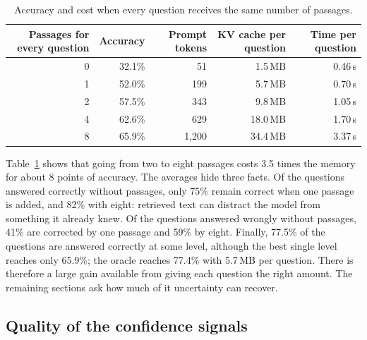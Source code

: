 \documentclass[11pt,a4paper]{article}
\begin{document}
\begin{table}[H]
\centering
\small
\begin{tabular}{@{}rrrrr@{}}
\toprule
Passages for every question & Accuracy & Prompt tokens & KV cache per question & Time per question \\
\midrule
0 & 32.1\% & 51 & 1.5\,MB & 0.46\,s \\
1 & 52.0\% & 199 & 5.7\,MB & 0.70\,s \\
2 & 57.5\% & 343 & 9.8\,MB & 1.05\,s \\
4 & 62.6\% & 629 & 18.0\,MB & 1.70\,s \\
8 & 65.9\% & 1{,}200 & 34.4\,MB & 3.37\,s \\
\bottomrule
\end{tabular}
\caption{Accuracy and cost when every question receives the same number of passages.}
\label{tab:fixed}
\end{table}

Table~\ref{tab:fixed} shows that going from two to eight passages costs 3.5
times the memory for about 8 points of accuracy. The averages hide three facts.
Of the questions answered correctly without passages, only 75\% remain correct
when one passage is added, and 82\% with eight: retrieved text can distract the
model from something it already knew. Of the questions answered wrongly without
passages, 41\% are corrected by one passage and 59\% by eight. Finally, 77.5\%
of the questions are answered correctly at some level, although the best single
level reaches only 65.9\%; the oracle reaches 77.4\% with 5.7\,MB per question.
There is therefore a large gain available from giving each question the right
amount. The remaining sections ask how much of it uncertainty can recover.

\subsection{Quality of the confidence signals}
\end{document}
